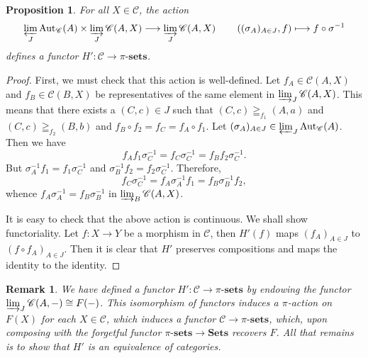 \documentclass[10pt]{article}
\theoremstyle{thmstyle}
\newtheorem{proposition}[theorem]{Proposition}
\theoremstyle{defstyle}
\newtheorem{remark}[theorem]{Remark}
\newcommand{\catSets}{\mathbf{Sets}}
\newcommand{\sets}[1]{#1\text{-}\mathbf{sets}}
\newcommand{\Aut}{\operatorname{Aut}}
\newcommand{\scrC}{\mathscr{C}} %
\begin{document}
\begin{proposition}
    For all $X\in\scrC$, the action 
    \begin{equation*}
        \varprojlim_{J}\Aut_{\scrC}(A)\times\varinjlim_{J}\scrC(A, X)\longrightarrow\varinjlim_J\scrC(A, X)\qquad\left((\sigma_A)_{A\in J}, f\right)\longmapsto f\circ\sigma^{-1}
    \end{equation*}
    defines a functor $H':\scrC\to\sets{\pi}$.
\end{proposition}
\begin{proof}
    First, we must check that this action is well-defined. Let $f_A\in\scrC(A, X)$ and $f_B\in\scrC(B, X)$ be representatives of the same element in $\varinjlim_J \scrC(A, X)$. This means that there exists a $(C, c)\in J$ such that $(C, c)\geqq_{f_1} (A, a)$ and $(C, c)\geqq_{f_2}(B, b)$ and $f_B\circ f_2 = f_C = f_A\circ f_1$. Let $(\sigma_A)_{A\in J}\in\varprojlim_J\Aut_{\scrC}(A)$. Then we have 
    \begin{equation*}
        f_Af_1\sigma_C^{-1} = f_C\sigma_C^{-1} = f_B f_2\sigma_C^{-1}.
    \end{equation*}
    But $\sigma_A^{-1} f_1 = f_1\sigma_C^{-1}$ and $\sigma_B^{-1}f_2 = f_2\sigma_C^{-1}$. Therefore, 
    \begin{equation*}
        f_C\sigma_C^{-1} = f_A\sigma_A^{-1}f_1 = f_B\sigma_B^{-1}f_2,
    \end{equation*}
    whence $f_A\sigma_A^{-1} = f_B\sigma_B^{-1}$ in $\varinjlim_{B}\scrC(A, X)$. 

    It is easy to check that the above action is continuous. We shall show functoriality. Let $f: X\to Y$ be a morphism in $\scrC$, then $H'(f)$ maps $(f_A)_{A\in J}$ to $(f\circ f_A)_{A\in J}$. Then it is clear that $H'$ preserves compositions and maps the identity to the identity.
\end{proof}

\begin{remark}
    We have defined a functor $H': \scrC\to\sets{\pi}$ by endowing the functor $\varinjlim_J\scrC(A, -)\cong F(-)$. This isomorphism of functors induces a $\pi$-action on $F(X)$ for each $X\in\scrC$, which induces a functor $\scrC\to\sets{\pi}$, which, upon composing with the forgetful functor $\sets{\pi}\to\catSets$ recovers $F$. All that remains is to show that $H'$ is an equivalence of categories.
\end{remark}
\end{document}
